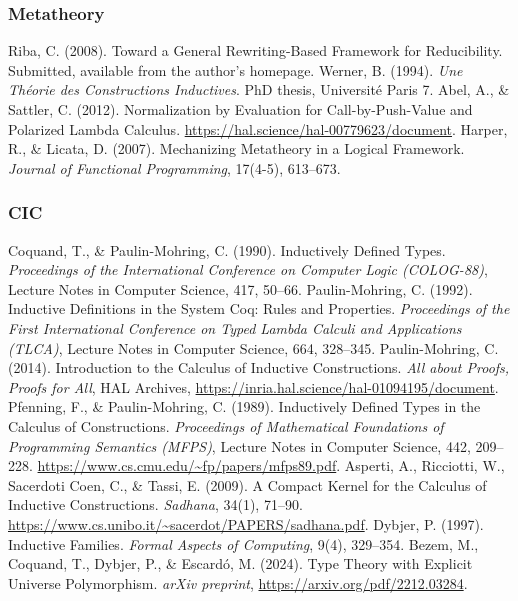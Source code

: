 \documentclass{article}
\theoremstyle{plain}
\theoremstyle{definition}
\begin{document}
\begin{thebibliography}{9}
\subsubsection*{Metatheory}
 Riba, C. (2008). Toward a General Rewriting-Based Framework for Reducibility. Submitted, available from the author’s homepage.
 Werner, B. (1994). \emph{Une Théorie des Constructions Inductives}. PhD thesis, Université Paris 7.
 Abel, A., \& Sattler, C. (2012). Normalization by Evaluation for Call-by-Push-Value and Polarized Lambda Calculus. \url{https://hal.science/hal-00779623/document}.
 Harper, R., \& Licata, D. (2007). Mechanizing Metatheory in a Logical Framework. \emph{Journal of Functional Programming}, 17(4-5), 613--673.
\newpage
\subsubsection*{CIC}
 Coquand, T., \& Paulin-Mohring, C. (1990). Inductively Defined Types. \emph{Proceedings of the International Conference on Computer Logic (COLOG-88)}, Lecture Notes in Computer Science, 417, 50--66.
 Paulin-Mohring, C. (1992). Inductive Definitions in the System Coq: Rules and Properties. \emph{Proceedings of the First International Conference on Typed Lambda Calculi and Applications (TLCA)}, Lecture Notes in Computer Science, 664, 328--345.
 Paulin-Mohring, C. (2014). Introduction to the Calculus of Inductive Constructions. \emph{All about Proofs, Proofs for All}, HAL Archives, \url{https://inria.hal.science/hal-01094195/document}.
 Pfenning, F., \& Paulin-Mohring, C. (1989). Inductively Defined Types in the Calculus of Constructions. \emph{Proceedings of Mathematical Foundations of Programming Semantics (MFPS)}, Lecture Notes in Computer Science, 442, 209--228. \url{https://www.cs.cmu.edu/~fp/papers/mfps89.pdf}.
 Asperti, A., Ricciotti, W., Sacerdoti Coen, C., \& Tassi, E. (2009). A Compact Kernel for the Calculus of Inductive Constructions. \emph{Sadhana}, 34(1), 71--90. \url{https://www.cs.unibo.it/~sacerdot/PAPERS/sadhana.pdf}.
 Dybjer, P. (1997). Inductive Families. \emph{Formal Aspects of Computing}, 9(4), 329--354.
 Bezem, M., Coquand, T., Dybjer, P., \& Escardó, M. (2024). Type Theory with Explicit Universe Polymorphism. \emph{arXiv preprint}, \url{https://arxiv.org/pdf/2212.03284}.

\end{thebibliography}
\end{document}
